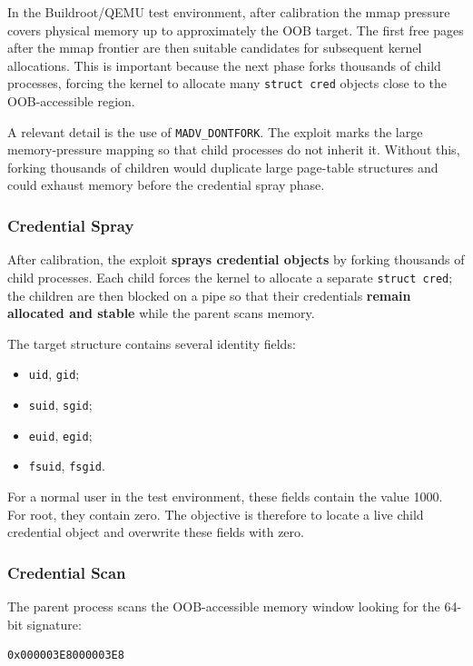\documentclass[../main.tex]{subfiles}
\begin{document}
In the Buildroot/QEMU test environment, after calibration the mmap pressure covers physical memory up to approximately the OOB target. The first free pages after the mmap frontier are then suitable candidates for subsequent kernel allocations. This is important because the next phase forks thousands of child processes, forcing the kernel to allocate many \texttt{struct cred} objects close to the OOB-accessible region.

A relevant detail is the use of \texttt{MADV\_DONTFORK}. The exploit marks the large memory-pressure mapping so that child processes do not inherit it. Without this, forking thousands of children would duplicate large page-table structures and could exhaust memory before the credential spray phase.
\subsubsection{Credential Spray}

After calibration, the exploit \textbf{sprays credential objects} by forking thousands of child processes. Each child forces the kernel to allocate a separate \texttt{struct cred}; the children are then blocked on a pipe so that their credentials \textbf{remain allocated and stable} while the parent scans memory.

The target structure contains several identity fields:

\begin{itemize}
    \item \texttt{uid}, \texttt{gid};
    \item \texttt{suid}, \texttt{sgid};
    \item \texttt{euid}, \texttt{egid};
    \item \texttt{fsuid}, \texttt{fsgid}.
\end{itemize}

For a normal user in the test environment, these fields contain the value 1000. For root, they contain zero. The objective is therefore to locate a live child credential object and overwrite these fields with zero.

\subsubsection{Credential Scan}

The parent process scans the OOB-accessible memory window looking for the 64-bit signature:

\begin{lstlisting}[caption={Credential signature searched by the exploit.}]
0x000003E8000003E8
\end{lstlisting}
\end{document}
